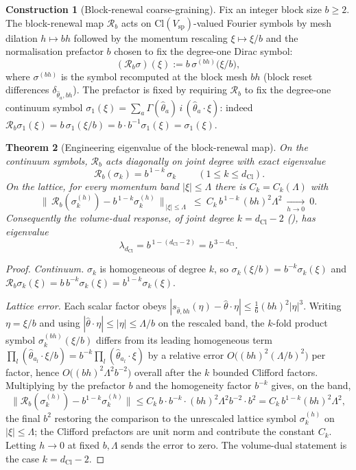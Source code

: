 \documentclass[11pt]{article}
\newtheorem{theorem}{Theorem}[section]
\theoremstyle{definition}
\newtheorem{construction}[theorem]{Construction}
\theoremstyle{remark}
\newcommand{\Cl}{\mathrm{Cl}}
\newcommand{\dCl}{d_{\mathrm{Cl}}}
\newcommand{\Vsp}{V_{\mathrm{sp}}}
\newcommand{\Rb}{\mathscr{R}_b}
\begin{document}
\begin{construction}[Block-renewal coarse-graining]
\label{constr:block-rg}
Fix an integer block size $b\ge2$.  The block-renewal map $\Rb$ acts on
$\Cl(\Vsp)$-valued Fourier symbols by mesh dilation $h\mapsto bh$ followed by the
momentum rescaling $\xi\mapsto\xi/b$ and the normalisation prefactor $b$ chosen to
fix the degree-one Dirac symbol:
\[
  (\Rb\sigma)(\xi):=b\,\sigma^{(bh)}\!\bigl(\xi/b\bigr),
\]
where $\sigma^{(bh)}$ is the symbol recomputed at the block mesh $bh$
\textup{(}block reset differences $\delta_{\hat\theta_a,bh}$\textup{)}.  The
prefactor is fixed by requiring $\Rb$ to fix the degree-one continuum symbol
$\sigma_1(\xi)=\sum_a\Gamma(\hat\theta_a)\,i\,(\hat\theta_a\cdot\xi)$: indeed
$\Rb\sigma_1(\xi)=b\,\sigma_1(\xi/b)=b\cdot b^{-1}\sigma_1(\xi)=\sigma_1(\xi)$.
\end{construction}

\begin{theorem}[Engineering eigenvalue of the block-renewal map]
\label{thm:rg-eigenvalue}
On the continuum symbols, $\Rb$ acts diagonally on joint degree with
exact eigenvalue
\[
  \boxed{\ \Rb(\sigma_k)=b^{\,1-k}\,\sigma_k\ }\qquad(1\le k\le\dCl).
\]
On the lattice, for every momentum band $|\xi|\le\Lambda$ there is $C_k=C_k(\Lambda)$
with
\[
  \bigl\|\,\Rb(\sigma_k^{(h)})-b^{\,1-k}\sigma_k^{(h)}\,\bigr\|_{\,|\xi|\le\Lambda}
  \ \le\ C_k\,b^{\,1-k}\,(bh)^2\Lambda^2
  \ \xrightarrow[h\to0]{}\ 0.
\]
Consequently the volume-dual response, of joint degree $k=\dCl-2$
\textup{(}\textup{)}, has eigenvalue
\[
  \boxed{\ \lambda_{\dCl}=b^{\,1-(\dCl-2)}=b^{\,3-\dCl}.\ }
\]
\end{theorem}

\begin{proof}
\emph{Continuum.}  $\sigma_k$ is homogeneous of degree $k$, so
$\sigma_k(\xi/b)=b^{-k}\sigma_k(\xi)$ and $\Rb\sigma_k(\xi)=b\,b^{-k}\sigma_k(\xi)
=b^{1-k}\sigma_k(\xi)$.

\emph{Lattice error.}  Each scalar factor obeys
$|s_{\hat\theta,bh}(\eta)-\hat\theta\cdot\eta|\le\tfrac16(bh)^2|\eta|^3$.  Writing
$\eta=\xi/b$ and using $|\hat\theta\cdot\eta|\le|\eta|\le\Lambda/b$ on the
rescaled band, the $k$-fold product symbol $\sigma_k^{(bh)}(\xi/b)$ differs from
its leading homogeneous term $\prod_l(\hat\theta_{a_l}\cdot\xi/b)
=b^{-k}\prod_l(\hat\theta_{a_l}\cdot\xi)$ by a relative error
$O\bigl((bh)^2(\Lambda/b)^2\bigr)$ per factor, hence
$O\bigl((bh)^2\Lambda^2 b^{-2}\bigr)$ overall after the $k$ bounded Clifford
factors.  Multiplying by the prefactor $b$ and the homogeneity factor $b^{-k}$
gives, on the band,
\[
  \bigl\|\Rb(\sigma_k^{(h)})-b^{1-k}\sigma_k^{(h)}\bigr\|
  \le C_k\,b\cdot b^{-k}\cdot(bh)^2\Lambda^2 b^{-2}\cdot b^{2}
  = C_k\,b^{1-k}(bh)^2\Lambda^2,
\]
the final $b^{2}$ restoring the comparison to the unrescaled lattice symbol
$\sigma_k^{(h)}$ on $|\xi|\le\Lambda$; the Clifford prefactors are unit norm and
contribute the constant $C_k$.  Letting $h\to0$ at fixed $b,\Lambda$ sends the
error to zero.  The volume-dual statement is the case $k=\dCl-2$.
\end{proof}
\end{document}
